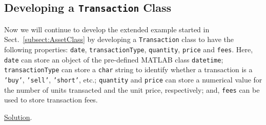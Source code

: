 \subsection{Developing a \texttt{Transaction} Class} \label{subsect:TransactionClass}

Now we will continue to develop the extended example started in Sect.\ \ref{subsect:AssetClass} by developing a \texttt{Transaction} class to have the following properties: \texttt{date}, \texttt{transactionType}, \texttt{quantity}, \texttt{price} and \texttt{fees}. Here, \texttt{date} can store an object of the pre-defined MATLAB class \texttt{datetime}; \texttt{transactionType} can store a \texttt{char} string to identify whether a transaction is a \texttt{'buy'}, \texttt{'sell'}, \texttt{'short'}, etc.; \texttt{quantity} and \texttt{price} can store a numerical value for the number of units transacted and the unit price, respectively; and, \texttt{fees} can be used to store transaction fees.

\noindent \underline{Solution}. 

